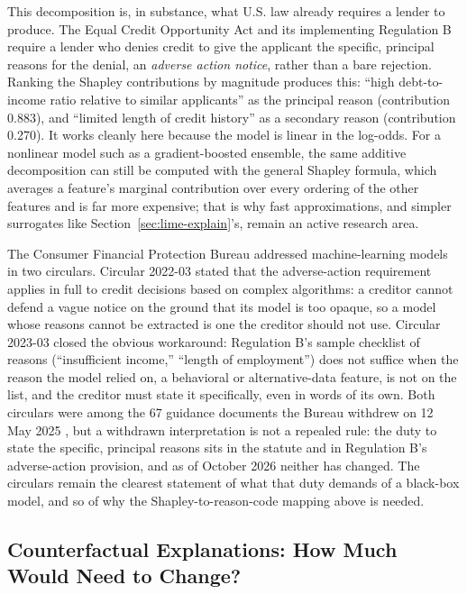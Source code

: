 \documentclass[../ai_in_finance]{subfiles}
\begin{document}
This decomposition is, in substance, what U.S. law already requires a lender to produce. The Equal Credit Opportunity Act and its implementing Regulation B require a lender who denies credit to give the applicant the specific, principal reasons for the denial, an \emph{adverse action notice}, rather than a bare rejection. Ranking the Shapley contributions by magnitude produces this: ``high debt-to-income ratio relative to similar applicants'' as the principal reason (contribution 0.883), and ``limited length of credit history'' as a secondary reason (contribution 0.270). It works cleanly here because the model is linear in the log-odds. For a nonlinear model such as a gradient-boosted ensemble, the same additive decomposition can still be computed with the general Shapley formula, which averages a feature's marginal contribution over every ordering of the other features and is far more expensive; that is why fast approximations, and simpler surrogates like Section~\ref{sec:lime-explain}'s, remain an active research area.

The Consumer Financial Protection Bureau addressed machine-learning models in two circulars. Circular 2022-03 \parencite{cfpb2022circular} stated that the adverse-action requirement applies in full to credit decisions based on complex algorithms: a creditor cannot defend a vague notice on the ground that its model is too opaque, so a model whose reasons cannot be extracted is one the creditor should not use. Circular 2023-03 \parencite{cfpb2023circular} closed the obvious workaround: Regulation B's sample checklist of reasons (``insufficient income,'' ``length of employment'') does not suffice when the reason the model relied on, a behavioral or alternative-data feature, is not on the list, and the creditor must state it specifically, even in words of its own. Both circulars were among the 67 guidance documents the Bureau withdrew on 12 May 2025 \parencite{cfpb2025withdrawal}, but a withdrawn interpretation is not a repealed rule: the duty to state the specific, principal reasons sits in the statute and in Regulation B's adverse-action provision, and as of October 2026 neither has changed. The circulars remain the clearest statement of what that duty demands of a black-box model, and so of why the Shapley-to-reason-code mapping above is needed.

\subsection{Counterfactual Explanations: How Much Would Need to Change?}
\label{sec:counterfactual}
\end{document}
